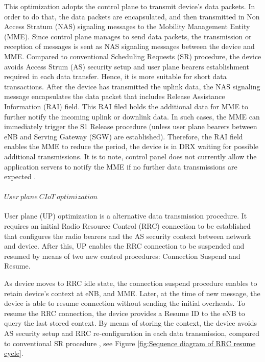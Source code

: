 \documentclass[12pt]{article}
\begin{document}
This optimization adopts the control plane to transmit device's data packets. In order to do that, the data packets are encapsulated, and then transmitted in Non Access Stratum (NAS) signaling messages to the Mobility Management Entity (MME).
Since control plane manages to send data packets, the transmission or reception of messages is sent as NAS signaling messages between the device and MME. Compared to conventional Scheduling Requests (SR) procedure, the device avoids Access Strum (AS) security setup and user plane bearers establishment required in each data transfer. Hence, it is more suitable for short data transactions.
After the device has transmitted the uplink data, the NAS signaling message encapsulates the data packet that includes Release Assistance Information (RAI) field. This RAI filed holds the additional data for MME to further notify the incoming uplink or downlink data. In such cases, the MME can immediately trigger the S1 Release procedure (unless user plane bearers between eNB and Serving Gateway (SGW) are established). Therefore, the RAI field enables the MME to reduce the period, the device is in DRX waiting for possible additional transmissions. It is to note, control panel does not currently allow the application servers to notify the MME if no further data transmissions are expected \cite{andres2017narrowband}.\par

\paragraph{$User\  plane\  CIoT\  optimization$} \label{RRC}
User plane (UP) optimization is a alternative data transmission procedure. It requires an initial Radio Resource Control (RRC) connection to be established that configures the radio bearers and the AS security context between network and device. After this, UP enables the RRC connection to be suspended and resumed by means of two new control procedures: Connection Suspend and Resume.\par
As device moves to RRC idle state, the connection suspend procedure enables to retain device's context at eNB, and MME. Later, at the time of new message, the device is able to resume connection without sending the initial overheads. To resume the RRC connection, the device provides a Resume ID to the eNB to query the last stored context. By means of storing the context, the device avoids AS security setup and RRC re-configuration in each data transmission, compared to conventional SR procedure \cite{farrell2018low,andres2017narrowband,popli2018survey}, see Figure \ref{fig:Sequence diagram of RRC resume cycle}.
\end{document}
